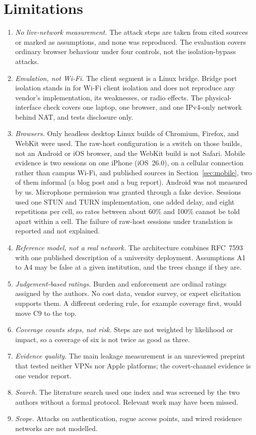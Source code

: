 \documentclass[conference]{IEEEtran}
\begin{document}
\section{Limitations}
\label{sec:limits}
\begin{enumerate}
\item \textit{No live-network measurement.} The attack steps are taken from cited sources or marked as assumptions, and none was reproduced. The evaluation covers ordinary browser behaviour under four controls, not the isolation-bypass attacks.
\item \textit{Emulation, not Wi-Fi.} The client segment is a Linux bridge. Bridge port isolation stands in for Wi-Fi client isolation and does not reproduce any vendor's implementation, its weaknesses, or radio effects. The physical-interface check covers one laptop, one browser, and one IPv4-only network behind NAT, and tests disclosure only.
\item \textit{Browsers.} Only headless desktop Linux builds of Chromium, Firefox, and WebKit were used. The raw-host configuration is a switch on those builds, not an Android or iOS browser, and the WebKit build is not Safari. Mobile evidence is two sessions on one iPhone (iOS~26.0), on a cellular connection rather than campus Wi-Fi, and published sources in Section~\ref{sec:mobile}, two of them informal (a blog post and a bug report). Android was not measured by us. Microphone permission was granted through a fake device. Sessions used one STUN and TURN implementation, one added delay, and eight repetitions per cell, so rates between about 60\% and 100\% cannot be told apart within a cell. The failure of raw-host sessions under translation is reported and not explained.
\item \textit{Reference model, not a real network.} The architecture combines RFC~7593 with one published description of a university deployment. Assumptions A1 to A4 may be false at a given institution, and the trees change if they are.
\item \textit{Judgement-based ratings.} Burden and enforcement are ordinal ratings assigned by the authors. No cost data, vendor survey, or expert elicitation supports them. A different ordering rule, for example coverage first, would move C9 to the top.
\item \textit{Coverage counts steps, not risk.} Steps are not weighted by likelihood or impact, so a coverage of six is not twice as good as three.
\item \textit{Evidence quality.} The main leakage measurement is an unreviewed preprint that tested neither VPNs nor Apple platforms; the covert-channel evidence is one vendor report.
\item \textit{Search.} The literature search used one index and was screened by the two authors without a formal protocol. Relevant work may have been missed.
\item \textit{Scope.} Attacks on authentication, rogue access points, and wired residence networks are not modelled.
\end{enumerate}
\end{document}
